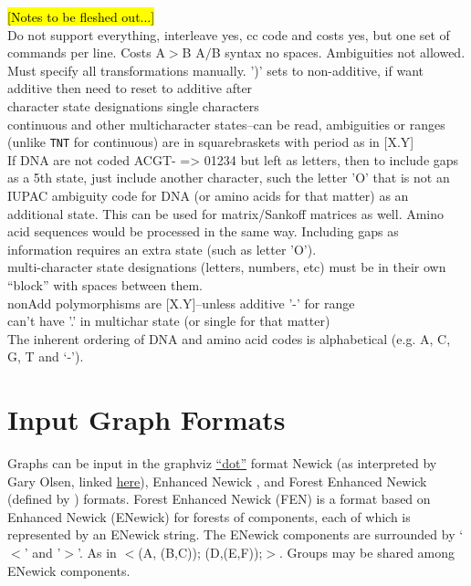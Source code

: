 \documentclass[11pt]{book}
\begin{document}
{{		\noindent \hl{[Notes to be fleshed out...]}\\
		Do not support everything, interleave yes, cc code and costs yes, but one set of commands per line.
		Costs A$>$B A$/$B syntax no spaces. Ambiguities not allowed.  Must specify all transformations manually.
		')' sets to non-additive, if want additive then need to reset to additive after\\
		character state designations single characters\\
		continuous and other multicharacter states--can be read, ambiguities or ranges (unlike \texttt{TNT} for continuous) are 
		in squarebraskets with period as in [X.Y]\\
		If DNA are not coded ACGT- => 01234 but left as letters,
		then to include gaps as a 5th state, just include another character, such the letter 'O' that is not an IUPAC 
		ambiguity code for DNA (or amino acids for that matter) as an additional state.  This can be used for 
		matrix/Sankoff matrices as well.
		Amino acid sequences would be processed in the same way.  Including gaps as information requires
		an extra state (such as letter 'O').\\ 
		multi-character state designations (letters, numbers, etc) must be in their own ``block'' with spaces 
		between them.\\
		nonAdd polymorphisms  are [X.Y]--unless  additive '-' for range\\
		can't have '.' in multichar state (or single for that matter)\\
		The inherent ordering of DNA and amino acid codes is alphabetical (e.g. A, C, G, T and `-').
%	
\section{Input Graph Formats}
	Graphs can be input in the graphviz \href{https://graphviz.org/}{``dot''} format Newick (as 		
	interpreted by Gary Olsen, linked \href{https://evolution.genetics.washington.edu/phylip/newick_doc.html}
	{here}), Enhanced Newick \cite{Cardonaetal2008}, and Forest Enhanced Newick (defined by 
	\citealp{Wheeler2022}) formats.
	Forest Enhanced Newick (FEN) is a format based on Enhanced Newick (ENewick) for 
	forests of components, each of which is represented by an ENewick string. The ENewick 
	components are surrounded by `$<$' and '$>$'. As in $<$(A, (B,C)); (D,(E,F));$>$. 
	Groups may be shared among ENewick components.
	
}}
\end{document}
